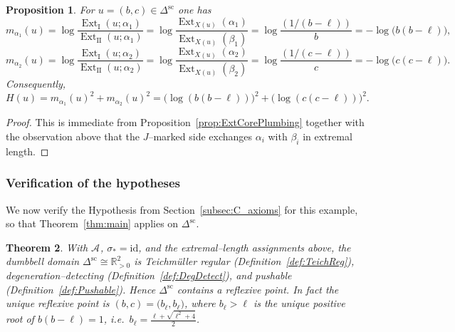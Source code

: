 \documentclass[a4paper,12pt]{amsart}
\newcommand{\R}{\mathbb{R}}
\DeclareMathOperator{\Ext}{Ext}
\newcommand{\id}{\mathrm{id}}
\theoremstyle{plain}
\newtheorem{theorem}{Theorem}[section]
\newtheorem{proposition}[theorem]{Proposition}
\theoremstyle{definition}
\begin{document}
\begin{proposition}\label{prop:mismatch_db}
For \(u=(b,c)\in\Delta^{\mathrm{sc}}_{}\) one has
\[
m_{\alpha_1}(u)=\log\frac{\Ext_{\mathrm{I}}(u;\alpha_1)}{\Ext_{\mathrm{II}}(u;\alpha_1)}
=\log\frac{\Ext_{X(u)}(\alpha_1)}{\Ext_{X(u)}(\beta_1)}
=\log\frac{(1/(b-\ell))}{b}
=-\log\bigl(b(b-\ell)\bigr),
\]
\[
m_{\alpha_2}(u)=\log\frac{\Ext_{\mathrm{I}}(u;\alpha_2)}{\Ext_{\mathrm{II}}(u;\alpha_2)}
=\log\frac{\Ext_{X(u)}(\alpha_2)}{\Ext_{X(u)}(\beta_2)}
=\log\frac{(1/(c-\ell))}{c}
=-\log\bigl(c(c-\ell)\bigr).
\]
Consequently,
\[
H(u)=m_{\alpha_1}(u)^2+m_{\alpha_2}(u)^2
=\bigl(\log(b(b-\ell))\bigr)^2+\bigl(\log(c(c-\ell))\bigr)^2.
\]
\end{proposition}

\begin{proof}
This is immediate from Proposition~\ref{prop:ExtCorePlumbing} together with the observation above that the
\(J\)--marked side exchanges \(\alpha_i\) with \(\beta_i\) in extremal length.
\end{proof}

\subsubsection{Verification of the hypotheses}

We now verify the Hypothesis from Section~\ref{subsec:C_axioms} for this example, so that
Theorem~\ref{thm:main} applies on \(\Delta^{\mathrm{sc}}_{}\).

\begin{theorem}\label{thm:good_example}
With \(\mathcal A_{}\), \(\sigma_\ast=\id\), and the extremal--length assignments above, the
dumbbell domain \(\Delta^{\mathrm{sc}}_{}\cong\R_{>0}^2\) is Teichm\"uller regular
(Definition~\ref{def:TeichReg}), degeneration--detecting (Definition~\ref{def:DegDetect}), and pushable
(Definition~\ref{def:Pushable}).  Hence \(\Delta^{\mathrm{sc}}_{}\) contains a reflexive point.
In fact the unique reflexive point is \((b,c)=\bigl(b_\ell,b_\ell\bigr)\), where \(b_\ell> \ell\) is the unique positive root of \(b(b-\ell)=1\), i.e.\ \(b_\ell=\frac{\ell+\sqrt{\ell^2+4}}{2}\).
\end{theorem}
\end{document}
